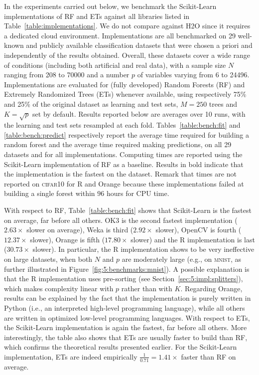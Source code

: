 In the experiments carried out below, we benchmark the Scikit-Learn
implementations of RF and ETs against all libraries listed in
Table~\ref{table:implementations}. We do not compare against H2O since it
requires a dedicated cloud environment. Implementations are all benchmarked on
29 well-known and publicly available classification datasets that were chosen a priori and
independently of the results obtained. Overall, these datasets cover a wide
range of conditions (including both artificial and real data), with a sample
size $N$ ranging from 208 to 70000 and a number $p$ of variables varying from 6
to 24496. Implementations are evaluated for (fully developed) Random Forests
(RF) and Extremely Randomized Trees (ETs) whenever available, using
respectively 75\% and 25\% of the original dataset as learning and test sets,
$M=250$ trees and $K=\sqrt{p}$ set by default. Results reported below are
averages over 10 runs, with the learning and test sets resampled at each fold.
Tables~\ref{table:bench:fit} and \ref{table:bench:predict} respectively report
the average time required for building a random forest and the average time
required making predictions, on all 29 datasets and for all implementations.
Computing times are reported using the Scikit-Learn implementation of RF as a
baseline. Results in bold indicate that the implementation is the fastest on
the dataset. Remark that times are not reported on \textsc{cifar10} for R and
Orange because these implementations failed at building a single forest within
$96$ hours for CPU time.

With respect to RF, Table~\ref{table:bench:fit} shows that Scikit-Learn is the
fastest on average, far before all others. OK3 is the second fastest
implementation ($2.63\times$ slower on average), Weka is third ($2.92\times$
slower), OpenCV is fourth ($12.37\times$ slower),  Orange is fifth
($17.80\times$ slower) and the R implementation is last ($30.73\times$ slower).
In particular, the R implementation shows to be very ineffective on large
datasets, when both $N$ and $p$ are moderately large (e.g., on \textsc{mnist},
as further illustrated in Figure~\ref{fig:5:benchmarks:mnist}). A possible explanation
is that the R implementation uses pre-sorting (see Section~\ref{sec:5:impl:splitters}), which makes complexity linear
with $p$ rather than with $K$. Regarding Orange, results can be explained by
the fact that the implementation is purely written in Python (i.e., an
interpreted high-level programming language), while all others are written in
optimized low-level programming languages. With respect to ETs, the
Scikit-Learn implementation is again the fastest, far before all others. More
interestingly, the table also shows that ETs are usually faster to build than RF,
which  confirms the theoretical results presented earlier. For the
Scikit-Learn implementation, ETs are indeed empirically $\tfrac{1}{0.71} = 1.41\times$
faster than RF on average.

